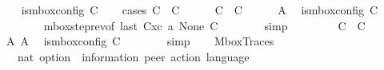 \begin{isabellebody}
\ \ \isamarkupfalse%
\ {\isachardoublequoteopen}is{\isacharunderscore}{\kern0pt}mbox{\isacharunderscore}{\kern0pt}config\ C{\isacharprime}{\kern0pt}{\isachardoublequoteclose}\isanewline
\ \ \isamarkupfalse%
\ {\isacharparenleft}{\kern0pt}cases\ {\isachardoublequoteopen}C\ {\isacharequal}{\kern0pt}\ C{\isacharprime}{\kern0pt}{\isachardoublequoteclose}{\isacharparenright}{\kern0pt}\isanewline
\ \ \ \ \isamarkupfalse%
\ {\isachardoublequoteopen}C\ {\isacharequal}{\kern0pt}\ C{\isacharprime}{\kern0pt}{\isachardoublequoteclose}\isanewline
\ \ \ \ \isamarkupfalse%
\ A{}\ \isamarkupfalse%
\ {\isachardoublequoteopen}is{\isacharunderscore}{\kern0pt}mbox{\isacharunderscore}{\kern0pt}config\ C{\isacharprime}{\kern0pt}{\isachardoublequoteclose}\isanewline
\ \ \ \ \ \ \isamarkupfalse%
\ mbox{\isacharunderscore}{\kern0pt}step{\isacharunderscore}{\kern0pt}rev{\isacharparenleft}{\kern0pt}{}{\isacharparenright}{\kern0pt}{\isacharbrackleft}{\kern0pt}of\ {\isachardoublequoteopen}last\ {\isacharparenleft}{\kern0pt}C{}{\isacharhash}{\kern0pt}xc{\isacharparenright}{\kern0pt}{\isachardoublequoteclose}\ a\ None\ C{\isacharbrackright}{\kern0pt}\isanewline
\ \ \ \ \ \ \isamarkupfalse%
\ simp\isanewline
\ \ \isamarkupfalse%
\isanewline
\ \ \ \ \isamarkupfalse%
\ {\isachardoublequoteopen}C\ {\isasymnoteq}\ C{\isacharprime}{\kern0pt}{\isachardoublequoteclose}\isanewline
\ \ \ \ \isamarkupfalse%
\ A{}\ A{}\ \isamarkupfalse%
\ {\isachardoublequoteopen}is{\isacharunderscore}{\kern0pt}mbox{\isacharunderscore}{\kern0pt}config\ C{\isacharprime}{\kern0pt}{\isachardoublequoteclose}\isanewline
\ \ \ \ \ \ \isamarkupfalse%
\ simp\isanewline
\ \ \isamarkupfalse%
\isanewline
{}\isamarkupfalse%
%
\endisatagproof
{\isafoldproof}%
%
\isadelimproof
\isanewline
%
\endisadelimproof
\isanewline
{}\isamarkupfalse%
\ MboxTraces\isanewline
\ \ {\isacharcolon}{\kern0pt}{\isacharcolon}{\kern0pt}\ {\isachardoublequoteopen}nat\ option\ {\isasymRightarrow}\ {\isacharparenleft}{\kern0pt}{\isacharprime}{\kern0pt}information{\isacharcomma}{\kern0pt}\ {\isacharprime}{\kern0pt}peer{\isacharparenright}{\kern0pt}\ action\ language{\isachardoublequoteclose}\ \ {\isacharparenleft}{\kern0pt}{\isachardoublequoteopen}{\isasymT}\isactrlbsub {\isacharunderscore}{\kern0pt}\isactrlesub {\isachardoublequoteclose}\ {\isacharbrackleft}{\kern0pt}{}{}{}{\isacharbrackright}{\kern0pt}\ {}{}{}{\isacharparenright}{\kern0pt}\isanewline

\end{isabellebody}
